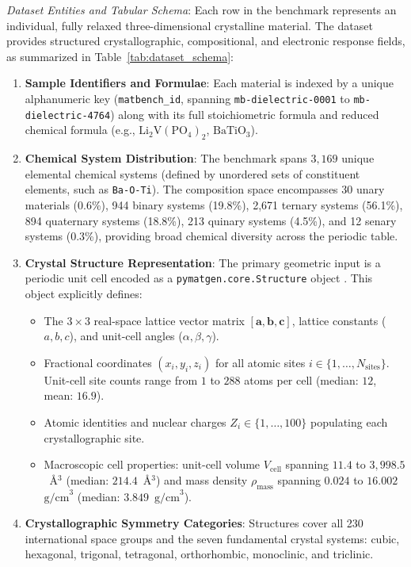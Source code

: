 \documentclass[final,3p,times]{elsarticle}
\begin{document}
\noindent\textit{Dataset Entities and Tabular Schema}: Each row in the benchmark represents an individual, fully relaxed three-dimensional crystalline material. The dataset provides structured crystallographic, compositional, and electronic response fields, as summarized in Table~\ref{tab:dataset_schema}:
\begin{enumerate}
    \item \textbf{Sample Identifiers and Formulae}: Each material is indexed by a unique alphanumeric key (\texttt{matbench\_id}, spanning \texttt{mb-dielectric-0001} to \texttt{mb-dielectric-4764}) along with its full stoichiometric formula and reduced chemical formula (e.g., $\text{Li}_2\text{V}(\text{PO}_4)_2$, $\text{BaTiO}_3$).
    \item \textbf{Chemical System Distribution}: The benchmark spans $3{,}169$ unique elemental chemical systems (defined by unordered sets of constituent elements, such as \texttt{Ba-O-Ti}). The composition space encompasses 30 unary materials (0.6\%), 944 binary systems (19.8\%), 2,671 ternary systems (56.1\%), 894 quaternary systems (18.8\%), 213 quinary systems (4.5\%), and 12 senary systems (0.3\%), providing broad chemical diversity across the periodic table.
    \item \textbf{Crystal Structure Representation}: The primary geometric input is a periodic unit cell encoded as a \texttt{pymatgen.core.Structure} object \cite{ong2013python}. This object explicitly defines:
    \begin{itemize}
        \item The $3 \times 3$ real-space lattice vector matrix $[\mathbf{a}, \mathbf{b}, \mathbf{c}]$, lattice constants ($a, b, c$), and unit-cell angles ($\alpha, \beta, \gamma$).
        \item Fractional coordinates $(x_i, y_i, z_i)$ for all atomic sites $i \in \{1, \dots, N_{\mathrm{sites}}\}$. Unit-cell site counts range from $1$ to $288$ atoms per cell (median: $12$, mean: $16.9$).
        \item Atomic identities and nuclear charges $Z_i \in \{1, \dots, 100\}$ populating each crystallographic site.
        \item Macroscopic cell properties: unit-cell volume $V_{\mathrm{cell}}$ spanning $11.4$ to $3{,}998.5$~\AA$^3$ (median: $214.4$~\AA$^3$) and mass density $\rho_{\mathrm{mass}}$ spanning $0.024$ to $16.002$~$\text{g/cm}^3$ (median: $3.849$~$\text{g/cm}^3$).
    \end{itemize}
    \item \textbf{Crystallographic Symmetry Categories}: Structures cover all 230 international space groups and the seven fundamental crystal systems: cubic, hexagonal, trigonal, tetragonal, orthorhombic, monoclinic, and triclinic.

\end{enumerate}
\end{document}
